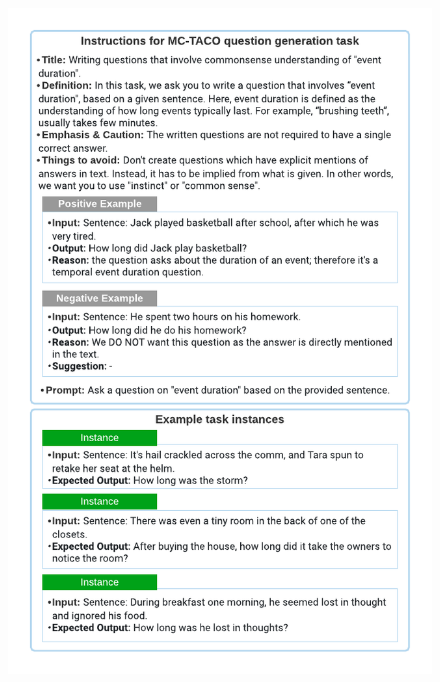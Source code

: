 \begin{figure}[t]
  \centering
  \begin{minipage}[t]{0.48\textwidth}
    \centering
    \includegraphics[width=1\textwidth]{figures/natural_instruction_fig1_a.pdf}
  \end{minipage}%
  \hfill
  \begin{minipage}[t]{0.48\textwidth}
    \centering

\end{minipage}
\end{figure}
